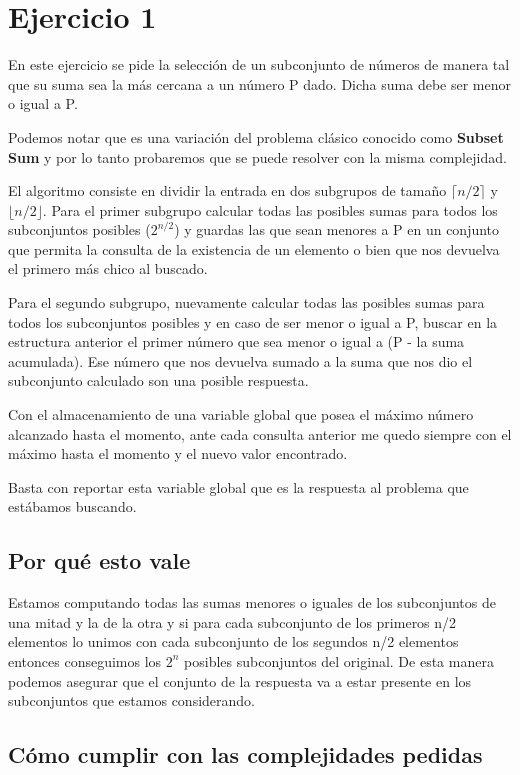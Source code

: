 \section{Ejercicio 1}

En este ejercicio se pide la selección de un subconjunto de números de manera tal que su suma sea la más cercana a un número P dado.
Dicha suma debe ser menor o igual a P.

Podemos notar que es una variación del problema clásico conocido como \textbf{Subset Sum} y por lo tanto probaremos que se puede resolver con la misma complejidad.

El algoritmo consiste en dividir la entrada en dos subgrupos de tamaño $\lceil n/2 \rceil$ y $\lfloor n/2 \rfloor$.
Para el primer subgrupo calcular todas las posibles sumas para todos los subconjuntos posibles ($2^{n/2}$) y guardas las que sean menores a P en un conjunto que permita la consulta de la existencia de un elemento o bien que nos devuelva el primero más chico al buscado.

Para el segundo subgrupo, nuevamente calcular todas las posibles sumas para todos los subconjuntos posibles y en caso de ser menor o igual a P, buscar en la estructura anterior el primer número que sea menor o igual a (P - la suma acumulada). Ese número que nos devuelva sumado a la suma que nos dio el subconjunto calculado son una posible respuesta. 

Con el almacenamiento de una variable global que posea el máximo número alcanzado hasta el momento, ante cada consulta anterior me quedo siempre con el máximo hasta el momento y el nuevo valor encontrado. 

Basta con reportar esta variable global que es la respuesta al problema que estábamos buscando.

\subsection{Por qué esto vale}

Estamos computando todas las sumas menores o iguales de los subconjuntos de una mitad y la de la otra y si para cada subconjunto de los primeros n/2 elementos lo unimos con cada subconjunto de los segundos n/2 elementos entonces conseguimos los $2^{n}$ posibles subconjuntos del original. De esta manera podemos asegurar que el conjunto de la respuesta va a estar presente en los subconjuntos que estamos considerando.

\subsection{Cómo cumplir con las complejidades pedidas}

